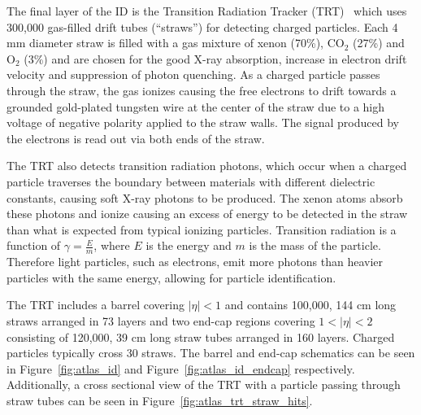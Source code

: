 

The final layer of the ID is the Transition Radiation Tracker (TRT)~\cite{atlas_trt} which uses 300,000 gas-filled drift tubes (``straws'') for detecting charged particles. Each 4 mm diameter straw is filled with a gas mixture of xenon (70\%), $\mathrm{CO}_2$ (27\%) and $\mathrm{O}_2$ (3\%) and are chosen for the good X-ray absorption, increase in electron drift velocity and suppression of photon quenching. As a charged particle passes through the straw, the gas ionizes causing the free electrons to drift towards a grounded gold-plated tungsten wire at the center of the straw due to a high voltage of negative polarity applied to the straw walls. The signal produced by the electrons is read out via both ends of the straw. 

The TRT also detects transition radiation photons, which occur when a charged particle traverses the boundary between materials with different dielectric constants, causing soft X-ray photons to be produced. The xenon atoms absorb these photons and ionize causing an excess of energy to be detected in the straw than what is expected from typical ionizing particles. Transition radiation is a function of $\gamma = \frac{E}{m}$, where $E$ is the energy and $m$ is the mass of the particle. Therefore light particles, such as electrons, emit more photons than heavier particles with the same energy, allowing for particle identification.

The TRT includes a barrel covering $|\eta| < 1$ and contains 100,000, 144 cm long straws arranged in 73 layers and two end-cap regions covering $1 < |\eta| < 2$ consisting of 120,000, 39 cm long straw tubes arranged in 160 layers. Charged particles typically cross 30 straws. The barrel and end-cap schematics can be seen in Figure~\ref{fig:atlas_id} and Figure~\ref{fig:atlas_id_endcap} respectively. Additionally, a cross sectional view of the TRT with a particle passing through straw tubes can be seen in Figure~\ref{fig:atlas_trt_straw_hits}.


